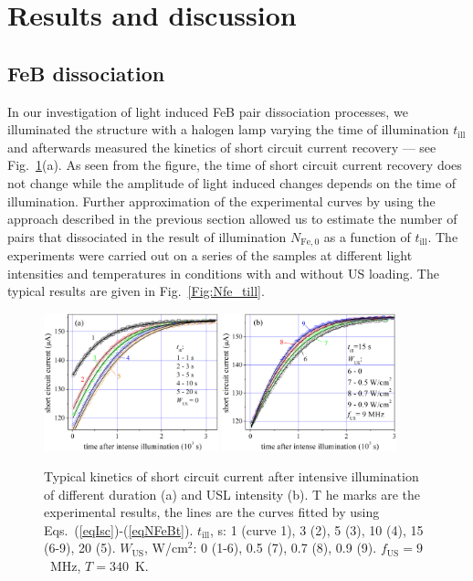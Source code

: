 \documentclass[%
 aip,jap,
 amsmath,amssymb,
 reprint,%
]{revtex4-1}
\begin{document}
\section{\label{sec:Rez}Results and discussion}
\subsection{\label{sec:FeBdis}FeB dissociation}


In our investigation of light induced FeB pair dissociation processes, 
we illuminated the structure with a halogen lamp varying the time of illumination 
$t_\mathrm{ill}$ and afterwards measured the 
kinetics of short circuit current recovery –-- see Fig.~\ref{Fig:IscKin}(a). 
As seen from the figure, the time of short circuit current recovery does not change while the amplitude of light induced changes depends on the time of illumination. 
Further approximation of the experimental curves by using the approach described in the previous section allowed us to estimate the number of pairs that dissociated in the result of illumination $N_\mathrm{Fe,0}$ as a function of $t_\mathrm{ill}$. 
The experiments were carried out on a series of the samples at different light intensities and temperatures in conditions with  and without US loading.
The typical results are given in Fig.~\ref{Fig:Nfe_till}.

\begin{figure}
\includegraphics[width=0.45\textwidth]{Fig3a}%
\includegraphics[width=0.45\textwidth]{Fig3b}%
\caption{\label{Fig:IscKin}
Typical kinetics of short circuit current after intensive illumination of different duration (a) and USL intensity (b). T
he marks are the experimental results, 
the lines are the curves fitted by using Eqs.~(\ref{eqIsc})-(\ref{eqNFeBt}). 
$t_\mathrm{ill}$, s: 1 (curve 1), 3 (2), 5 (3), 10 (4), 15 (6-9), 20 (5). 
$W_\mathrm{US}$, W/cm$^2$: 0 (1-6), 0.5 (7), 0.7 (8), 0.9 (9). 
$f_\mathrm{US}=9$~MHz, $T=340$~K.
}
\end{figure}
\end{document}

